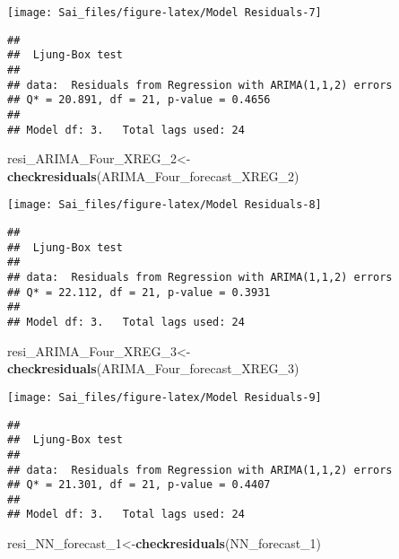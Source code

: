 \documentclass[
]{article}
\newenvironment{Shaded}{\begin{snugshade}}{\end{snugshade}}
\newcommand{\FunctionTok}[1]{\textcolor[rgb]{0.13,0.29,0.53}{\textbf{#1}}}
\newcommand{\NormalTok}[1]{#1}
\newcommand{\OtherTok}[1]{\textcolor[rgb]{0.56,0.35,0.01}{#1}}
\begin{document}
\begin{center}\texttt{[image: Sai\_files/figure-latex/Model Residuals-7]} \end{center}

\begin{verbatim}
## 
##  Ljung-Box test
## 
## data:  Residuals from Regression with ARIMA(1,1,2) errors
## Q* = 20.891, df = 21, p-value = 0.4656
## 
## Model df: 3.   Total lags used: 24
\end{verbatim}

\begin{Shaded}
\begin{Highlighting}[]
\NormalTok{resi\_ARIMA\_Four\_XREG\_2}\OtherTok{\textless{}{-}}\FunctionTok{checkresiduals}\NormalTok{(ARIMA\_Four\_forecast\_XREG\_2)}
\end{Highlighting}
\end{Shaded}

\begin{center}\texttt{[image: Sai\_files/figure-latex/Model Residuals-8]} \end{center}

\begin{verbatim}
## 
##  Ljung-Box test
## 
## data:  Residuals from Regression with ARIMA(1,1,2) errors
## Q* = 22.112, df = 21, p-value = 0.3931
## 
## Model df: 3.   Total lags used: 24
\end{verbatim}

\begin{Shaded}
\begin{Highlighting}[]
\NormalTok{resi\_ARIMA\_Four\_XREG\_3}\OtherTok{\textless{}{-}}\FunctionTok{checkresiduals}\NormalTok{(ARIMA\_Four\_forecast\_XREG\_3)}
\end{Highlighting}
\end{Shaded}

\begin{center}\texttt{[image: Sai\_files/figure-latex/Model Residuals-9]} \end{center}

\begin{verbatim}
## 
##  Ljung-Box test
## 
## data:  Residuals from Regression with ARIMA(1,1,2) errors
## Q* = 21.301, df = 21, p-value = 0.4407
## 
## Model df: 3.   Total lags used: 24
\end{verbatim}

\begin{Shaded}
\begin{Highlighting}[]
\NormalTok{resi\_NN\_forecast\_1}\OtherTok{\textless{}{-}}\FunctionTok{checkresiduals}\NormalTok{(NN\_forecast\_1)}
\end{Highlighting}
\end{Shaded}
\end{document}
